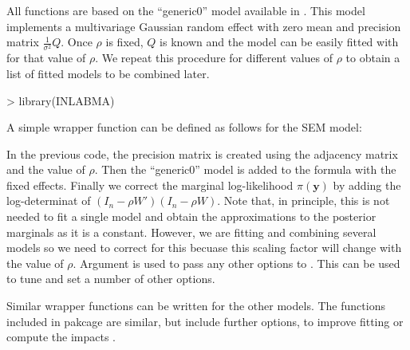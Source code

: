 \documentclass[article]{jss}
\begin{document}
All functions are based on the ``generic0'' model available in  .
This model implements a multivariage Gaussian random effect with zero mean
and precision matrix $\frac{1}{\sigma^2} Q$. Once $\rho$ is fixed, $Q$ is
known and the model can be easily fitted with  for that value of
$\rho$. We repeat this procedure for different values of $\rho$ to
obtain a list of fitted models to be combined later.

\begin{Schunk}
\begin{Sinput}
> library(INLABMA)
\end{Sinput}
\end{Schunk}

A simple wrapper function can be defined as follows for the SEM model:

\begin{Schunk}
\end{Schunk}

In the previous code, the precision matrix is created using the adjacency
matrix and the value of $\rho$. Then the ``generic0'' model is added to the
formula with the fixed effects. Finally we correct the marginal log-likelihood
$\pi(\mathbf{y})$ by adding the log-determinat of $(I_n-\rho W')(I_n-\rho W)$.
Note that, in principle, this is not needed to fit a single model and obtain
the approximations to the posterior marginals as it is a constant. However, we
are fitting and combining several models so we need to correct for this
becuase this scaling factor will change with the value of $\rho$.
Argument  is used to pass any other options to . 
This can be used to tune and set a number of other options.

Similar wrapper functions can be written for the other models. The functions
included in pakcage  are similar, but include further options,
to improve fitting or compute the impacts 
\citep[see,][for details]{Bivandetal:2013}.
\end{document}
